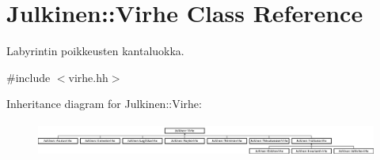 \hypertarget{class_julkinen_1_1_virhe}{}\section{Julkinen\+:\+:Virhe Class Reference}
\label{class_julkinen_1_1_virhe}


Labyrintin poikkeusten kantaluokka.  




{\ttfamily \#include $<$virhe.\+hh$>$}

Inheritance diagram for Julkinen\+:\+:Virhe\+:\begin{figure}[H]
\begin{center}
\leavevmode
\includegraphics[height=1.160221cm]{class_julkinen_1_1_virhe}
\end{center}
\end{figure}
